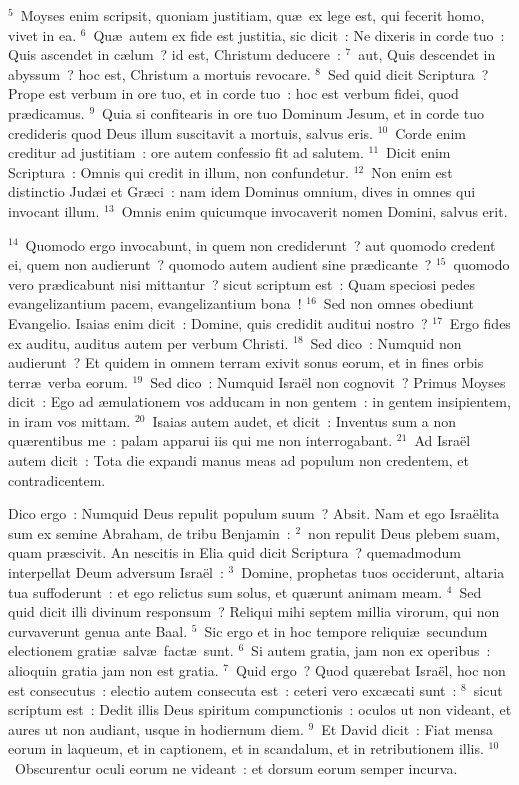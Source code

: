 ${}^{5}$~Moyses enim scripsit, quoniam justitiam, qu\ae\ ex lege est, qui fecerit homo, vivet in ea.
${}^{6}$~Qu\ae\ autem ex fide est justitia, sic dicit~: Ne dixeris in corde tuo~: Quis ascendet in c\ae lum~? id est, Christum deducere~:
${}^{7}$~aut, Quis descendet in abyssum~? hoc est, Christum a mortuis revocare.
${}^{8}$~Sed quid dicit Scriptura~? Prope est verbum in ore tuo, et in corde tuo~: hoc est verbum fidei, quod pr\ae dicamus.
${}^{9}$~Quia si confitearis in ore tuo Dominum Jesum, et in corde tuo credideris quod Deus illum suscitavit a mortuis, salvus eris.
${}^{10}$~Corde enim creditur ad justitiam~: ore autem confessio fit ad salutem.
${}^{11}$~Dicit enim Scriptura~: Omnis qui credit in illum, non confundetur.
${}^{12}$~Non enim est distinctio Jud\ae i et Gr\ae ci~: nam idem Dominus omnium, dives in omnes qui invocant illum.
${}^{13}$~Omnis enim quicumque invocaverit nomen Domini, salvus erit.


${}^{14}$~Quomodo ergo invocabunt, in quem non crediderunt~? aut quomodo credent ei, quem non audierunt~? quomodo autem audient sine pr\ae dicante~?
${}^{15}$~quomodo vero pr\ae dicabunt nisi mittantur~? sicut scriptum est~: Quam speciosi pedes evangelizantium pacem, evangelizantium bona~!
${}^{16}$~Sed non omnes obediunt Evangelio. Isaias enim dicit~: Domine, quis credidit auditui nostro~?
${}^{17}$~Ergo fides ex auditu, auditus autem per verbum Christi.
${}^{18}$~Sed dico~: Numquid non audierunt~? Et quidem in omnem terram exivit sonus eorum, et in fines orbis terr\ae\ verba eorum.
${}^{19}$~Sed dico~: Numquid Isra\"el non cognovit~? Primus Moyses dicit~: Ego ad \ae mulationem vos adducam in non gentem~: in gentem insipientem, in iram vos mittam.
${}^{20}$~Isaias autem audet, et dicit~: Inventus sum a non qu\ae rentibus me~: palam apparui iis qui me non interrogabant.
${}^{21}$~Ad Isra\"el autem dicit~: Tota die expandi manus meas ad populum non credentem, et contradicentem.

\lettrine[lines=3,image=true,loversize=0.05,lraise=-0.03]{D}{}ico ergo~: Numquid Deus repulit populum suum~? Absit. Nam et ego Isra\"elita sum ex semine Abraham, de tribu Benjamin~:
${}^{2}$~non repulit Deus plebem suam, quam pr\ae scivit. An nescitis in Elia quid dicit Scriptura~? quemadmodum interpellat Deum adversum Isra\"el~:
${}^{3}$~Domine, prophetas tuos occiderunt, altaria tua suffoderunt~: et ego relictus sum solus, et qu\ae runt animam meam.
${}^{4}$~Sed quid dicit illi divinum responsum~? Reliqui mihi septem millia virorum, qui non curvaverunt genua ante Baal.
${}^{5}$~Sic ergo et in hoc tempore reliqui\ae\ secundum electionem grati\ae\ salv\ae\ fact\ae\ sunt.
${}^{6}$~Si autem gratia, jam non ex operibus~: alioquin gratia jam non est gratia.
${}^{7}$~Quid ergo~? Quod qu\ae rebat Isra\"el, hoc non est consecutus~: electio autem consecuta est~: ceteri vero exc\ae cati sunt~:
${}^{8}$~sicut scriptum est~: Dedit illis Deus spiritum compunctionis~: oculos ut non videant, et aures ut non audiant, usque in hodiernum diem.
${}^{9}$~Et David dicit~: Fiat mensa eorum in laqueum, et in captionem, et in scandalum, et in retributionem illis.
${}^{10}$~Obscurentur oculi eorum ne videant~: et dorsum eorum semper incurva.



